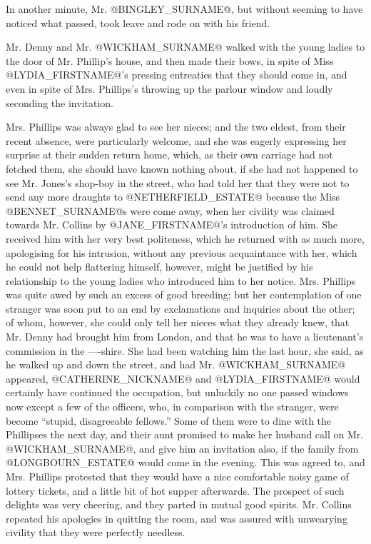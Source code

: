 In another minute, Mr. @BINGLEY_SURNAME@, but without seeming to have noticed what
passed, took leave and rode on with his friend.

Mr. Denny and Mr. @WICKHAM_SURNAME@ walked with the young ladies to the door of
Mr. Phillip's house, and then made their bows, in spite of Miss @LYDIA_FIRSTNAME@'s
pressing entreaties that they should come in, and even in spite of
Mrs. Phillips's throwing up the parlour window and loudly seconding the
invitation.

Mrs. Phillips was always glad to see her nieces; and the two eldest,
from their recent absence, were particularly welcome, and she was
eagerly expressing her surprise at their sudden return home, which, as
their own carriage had not fetched them, she should have known nothing
about, if she had not happened to see Mr. Jones's shop-boy in the
street, who had told her that they were not to send any more draughts to
@NETHERFIELD_ESTATE@ because the Miss @BENNET_SURNAME@s were come away, when her civility
was claimed towards Mr. Collins by @JANE_FIRSTNAME@'s introduction of him. She
received him with her very best politeness, which he returned with
as much more, apologising for his intrusion, without any previous
acquaintance with her, which he could not help flattering himself,
however, might be justified by his relationship to the young ladies who
introduced him to her notice. Mrs. Phillips was quite awed by such an
excess of good breeding; but her contemplation of one stranger was soon
put to an end by exclamations and inquiries about the other; of whom,
however, she could only tell her nieces what they already knew, that
Mr. Denny had brought him from London, and that he was to have a
lieutenant's commission in the ----shire. She had been watching him the
last hour, she said, as he walked up and down the street, and had Mr.
@WICKHAM_SURNAME@ appeared, @CATHERINE_NICKNAME@ and @LYDIA_FIRSTNAME@ would certainly have continued the
occupation, but unluckily no one passed windows now except a few of the
officers, who, in comparison with the stranger, were become ``stupid,
disagreeable fellows.'' Some of them were to dine with the Phillipses
the next day, and their aunt promised to make her husband call on Mr.
@WICKHAM_SURNAME@, and give him an invitation also, if the family from @LONGBOURN_ESTATE@
would come in the evening. This was agreed to, and Mrs. Phillips
protested that they would have a nice comfortable noisy game of lottery
tickets, and a little bit of hot supper afterwards. The prospect of such
delights was very cheering, and they parted in mutual good spirits. Mr.
Collins repeated his apologies in quitting the room, and was assured
with unwearying civility that they were perfectly needless.


